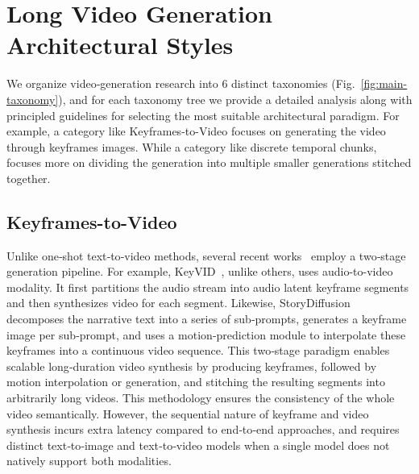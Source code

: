 \section{Long Video Generation Architectural Styles}
\label{sec:taxonomy}
We organize video‐generation research into 6 distinct taxonomies (Fig.~\ref{fig:main-taxonomy}), and for each taxonomy tree we provide a detailed analysis along with principled guidelines for selecting the most suitable architectural paradigm. For example, a category like Keyframes-to-Video focuses on generating the video through keyframes images. While a category like discrete temporal chunks, focuses more on dividing the generation into multiple smaller generations stitched together.

\subsection{Keyframes-to-Video}
\label{sec:arch-keyframe}
Unlike one‐shot text‐to‐video methods, several recent works~\cite{chen2025hunyuanvideoavatar,movieagent2025,zhou2024storydiffusion,zhang2023i2vgenxl,liu2023autostory,ho2022vdm} employ a two‐stage generation pipeline. For example, KeyVID~\cite{wang2025keyvid}, unlike others, uses audio-to-video modality. It first partitions the audio stream into audio latent keyframe segments and then synthesizes video for each segment. Likewise, StoryDiffusion~\cite{zhou2024storydiffusion} decomposes the narrative text into a series of sub‐prompts, generates a keyframe image per sub‐prompt, and uses a motion‐prediction module to interpolate these keyframes into a continuous video sequence. This two‐stage paradigm enables scalable long‐duration video synthesis by producing keyframes, followed by motion interpolation or generation, and stitching the resulting segments into arbitrarily long videos. This methodology ensures the consistency of the whole video semantically. However, the sequential nature of keyframe and video synthesis incurs extra latency compared to end‐to‐end approaches, and requires distinct text‐to‐image and text‐to‐video models when a single model does not natively support both modalities.


